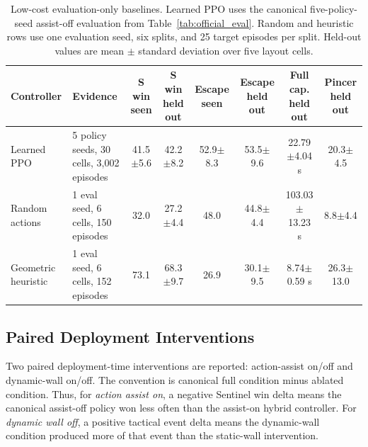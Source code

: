 \documentclass[journal]{IEEEtran}
\begin{document}
\begin{table}[t]
\centering
\caption{Low-cost evaluation-only baselines. Learned PPO uses the canonical
five-policy-seed assist-off evaluation from Table~\ref{tab:official_eval}.
Random and heuristic rows use one evaluation seed, six splits, and 25 target
episodes per split. Held-out values are mean $\pm$ standard deviation over five
layout cells.}
\label{tab:diagnostic_baselines}
\scriptsize
\setlength{\tabcolsep}{3pt}
\begin{tabular}{p{2.6cm}p{3.2cm}cccccc}
\toprule
Controller & Evidence & S win seen & S win held out & Escape seen & Escape held out & Full cap. held out & Pincer held out \\
\midrule
Learned PPO & 5 policy seeds, 30 cells, 3{,}002 episodes & 41.5$\pm$5.6 & 42.2$\pm$8.2 & 52.9$\pm$8.3 & 53.5$\pm$9.6 & 22.79$\pm$4.04 s & 20.3$\pm$4.5 \\
Random actions & 1 eval seed, 6 cells, 150 episodes & 32.0 & 27.2$\pm$4.4 & 48.0 & 44.8$\pm$4.4 & 103.03$\pm$13.23 s & 8.8$\pm$4.4 \\
Geometric heuristic & 1 eval seed, 6 cells, 152 episodes & 73.1 & 68.3$\pm$9.7 & 26.9 & 30.1$\pm$9.5 & 8.74$\pm$0.59 s & 26.3$\pm$13.0 \\
\bottomrule
\end{tabular}
\end{table}

\subsection{Paired Deployment Interventions}

Two paired deployment-time interventions are reported: action-assist on/off and
dynamic-wall on/off. The convention is canonical full condition
minus ablated condition. Thus, for \emph{action assist on}, a negative Sentinel
win delta means the canonical assist-off policy won less often than the
assist-on hybrid controller. For \emph{dynamic wall off}, a positive tactical
event delta means the dynamic-wall condition produced more of that event than
the static-wall intervention.
\end{document}
